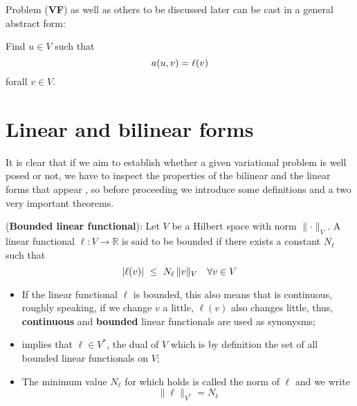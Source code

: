 Problem (\mbox{\textbf{VF}}) as well as others to be discussed later
can be cast in a general abstract form:

\begin{kaobox}[frametitle=Abstract variational problem]
Find $u \in V$ such that
\begin{equation}
        a(u,v) = \ell(v) \labeq{abstvp}
\end{equation}
forall $v \in V$.
\end{kaobox}

\section{Linear and bilinear forms}

It is clear that if we aim to establish whether a given
variational problem is well posed or not,
we have to inspect the properties of the bilinear and the linear
forms that appear , so before proceeding we introduce
some definitions and a two very important theorems.

\begin{definition}  
(\textbf{Bounded linear functional}): Let $V$ be a Hilbert space
with norm $\lVert \cdot \rVert_V$. A linear functional
$\ell: V \rightarrow \mathbb{R}$ is said to be
bounded if there exists a constant $N_{\ell}$ such that
\begin{equation}
|\ell(v)| ~\le~ N_\ell \, \lVert v \rVert_V~~~\forall v \in V \labeq{boundlin}
\end{equation}
\end{definition}

\begin{itemize}
\item If the linear functional $\ell$ is bounded, this also means
that is continuous, roughly speaking, if we change $v$ a little, $\ell(v)$ also
changes little,
thus, \textbf{continuous} and \textbf{bounded} linear
functionals are used as synonysms;\\
\item {} implies that $\ell \in V^*$, the dual of $V$
which is by definition the set of all bounded linear functionals
on $V$;\\
\item The minimum value $N_\ell$ for which  holds
is called the norm of $\ell$ and we write
\begin{equation}
\lVert \ell \rVert_{V^*} = N_{\ell}
\end{equation}
\end{itemize}

